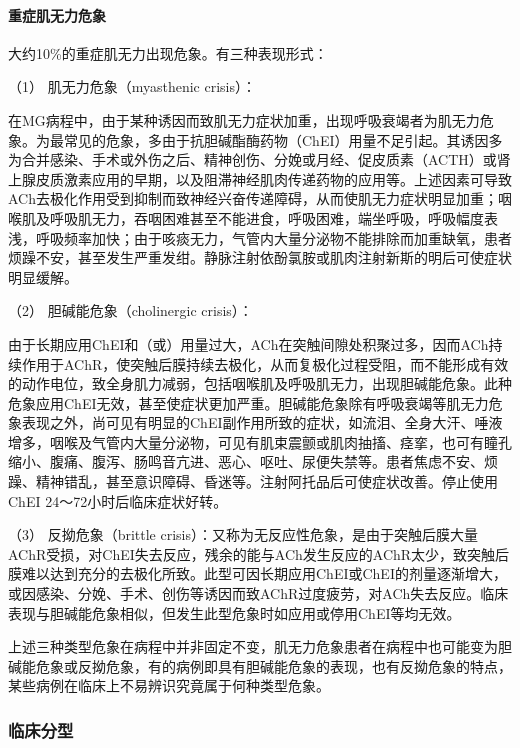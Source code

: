 \paragraph{重症肌无力危象}

大约10\%的重症肌无力出现危象。有三种表现形式：

\hypertarget{text00128.htmlux5cux23CHP4-17-2-1-4-1}{}
（1） 肌无力危象（myasthenic crisis）：

在MG病程中，由于某种诱因而致肌无力症状加重，出现呼吸衰竭者为肌无力危象。为最常见的危象，多由于抗胆碱酯酶药物（ChEI）用量不足引起。其诱因多为合并感染、手术或外伤之后、精神创伤、分娩或月经、促皮质素（ACTH）或肾上腺皮质激素应用的早期，以及阻滞神经肌肉传递药物的应用等。上述因素可导致ACh去极化作用受到抑制而致神经兴奋传递障碍，从而使肌无力症状明显加重；咽喉肌及呼吸肌无力，吞咽困难甚至不能进食，呼吸困难，端坐呼吸，呼吸幅度表浅，呼吸频率加快；由于咳痰无力，气管内大量分泌物不能排除而加重缺氧，患者烦躁不安，甚至发生严重发绀。静脉注射依酚氯胺或肌肉注射新斯的明后可使症状明显缓解。

\hypertarget{text00128.htmlux5cux23CHP4-17-2-1-4-2}{}
（2） 胆碱能危象（cholinergic crisis）：

由于长期应用ChEI和（或）用量过大，ACh在突触间隙处积聚过多，因而ACh持续作用于AChR，使突触后膜持续去极化，从而复极化过程受阻，而不能形成有效的动作电位，致全身肌力减弱，包括咽喉肌及呼吸肌无力，出现胆碱能危象。此种危象应用ChEI无效，甚至使症状更加严重。胆碱能危象除有呼吸衰竭等肌无力危象表现之外，尚可见有明显的ChEI副作用所致的症状，如流泪、全身大汗、唾液增多，咽喉及气管内大量分泌物，可见有肌束震颤或肌肉抽搐、痉挛，也可有瞳孔缩小、腹痛、腹泻、肠鸣音亢进、恶心、呕吐、尿便失禁等。患者焦虑不安、烦躁、精神错乱，甚至意识障碍、昏迷等。注射阿托品后可使症状改善。停止使用ChEI
24～72小时后临床症状好转。

（3） 反拗危象（brittle
crisis）：又称为无反应性危象，是由于突触后膜大量AChR受损，对ChEI失去反应，残余的能与ACh发生反应的AChR太少，致突触后膜难以达到充分的去极化所致。此型可因长期应用ChEI或ChEI的剂量逐渐增大，或因感染、分娩、手术、创伤等诱因而致AChR过度疲劳，对ACh失去反应。临床表现与胆碱能危象相似，但发生此型危象时如应用或停用ChEI等均无效。

上述三种类型危象在病程中并非固定不变，肌无力危象患者在病程中也可能变为胆碱能危象或反拗危象，有的病例即具有胆碱能危象的表现，也有反拗危象的特点，某些病例在临床上不易辨识究竟属于何种类型危象。

\subsubsection{临床分型}


